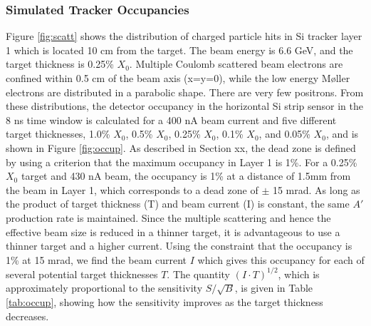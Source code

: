 \subsubsection{Simulated Tracker Occupancies}

Figure \ref{fig:scatt} shows the distribution of charged particle hits in Si tracker layer 1 
which is located 
10 cm from the target. The beam energy is 6.6 GeV, and the target thickness is 
0.25\% $X_0$. Multiple Coulomb scattered beam electrons are confined within 0.5 cm of the beam axis
(x=y=0), while the low energy M{\o}ller electrons are distributed in a parabolic shape. There are
very few positrons. From these distributions, the detector occupancy in the horizontal Si strip
sensor in the 8 ns time window is calculated for a 400 nA beam current and five different target
thicknesses, 1.0\% $X_0$, 0.5\% $X_0$, 0.25\% $X_0$, 0.1\% $X_0$, and 0.05\% $X_0$, and is shown
in Figure \ref{fig:occup}. As described in Section xx, the dead zone is defined by using 
a criterion that the
maximum occupancy in Layer 1 is 1\%. For a 0.25\% $X_0$ target and 430 nA beam, the occupancy is 
1\% at a distance of 1.5mm from the beam in Layer 1, which corresponds to a dead zone of $\pm$ 15
mrad. As long as the product of target thickness (T) and beam current (I) is constant, the same 
$A'$ production rate is maintained. Since the multiple scattering and hence the effective beam size 
is reduced in a thinner target, it is advantageous to use a thinner target and a higher current.
Using the constraint that the occupancy is 1\% at 15 mrad, we find the beam current $I$ which 
gives this occupancy for each of several potential target thicknesses $T$. The quantity 
$(I\cdot T)^{1/2}$, which is approximately proportional to the sensitivity $S/\sqrt{B}$, is
given in Table \ref{tab:occup}, showing how the sensitivity improves as the target thickness 
decreases.

